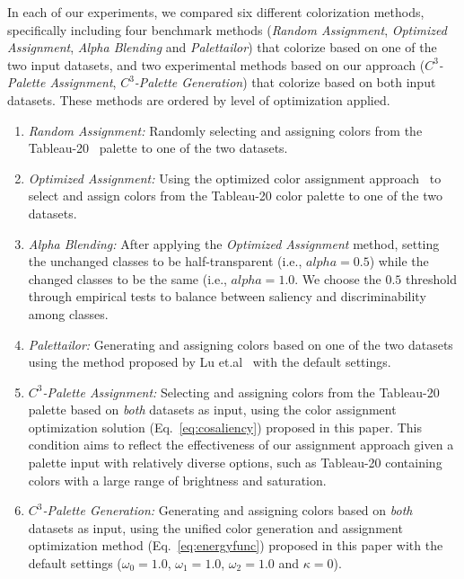 \vspace{.3em}
 In each of our experiments, we compared six different colorization methods, specifically including four benchmark methods (\emph{Random Assignment}, \emph{Optimized Assignment}, \emph{Alpha Blending} and \emph{Palettailor}) that colorize based on one of the two input datasets, and two experimental methods based on our approach (\emph{$C^3$-Palette Assignment}, \emph{$C^3$-Palette Generation}) that colorize based on both input datasets. These methods are ordered by level of optimization applied.
\begin{enumerate}
     \item \emph{Random Assignment:} Randomly selecting and assigning colors from the Tableau-20~\cite{tableau} palette to one of the two datasets.
     \item \emph{Optimized Assignment:} Using the optimized color assignment approach~\cite{Wang2018} to select and assign colors from the Tableau-20 color palette to one of the two datasets.
     \item \emph{Alpha Blending:} After applying the \emph{Optimized Assignment} method, setting the unchanged classes to be half-transparent (i.e., $alpha=0.5$) while the changed classes to be the same (i.e., $alpha=1.0$. We choose the $0.5$ threshold through empirical tests to balance between saliency and discriminability among classes. 
     \item \emph{Palettailor:} Generating and assigning colors based on one of the two datasets using the method proposed by Lu et.al~\cite{Lu21} with the default settings.
     \item \emph{$C^3$-Palette Assignment:} Selecting and assigning colors from the Tableau-20 palette based on \emph{both} datasets as input, using the color assignment optimization solution (Eq.~\ref{eq:cosaliency}) proposed in this paper. This condition aims to reflect the effectiveness of our assignment approach given a palette input with relatively diverse options, such as Tableau-20 containing colors with a large range of brightness and saturation.
     \item \emph{$C^3$-Palette Generation:} Generating and assigning colors based on \emph{both} datasets as input, using the unified color generation and assignment optimization method (Eq.~\ref{eq:energyfunc}) proposed in this paper with the default settings ($\omega_0=1.0$, $\omega_1=1.0$, $\omega_2=1.0$ and $\kappa=0$).
\end{enumerate}


